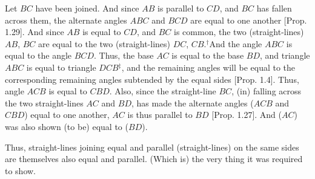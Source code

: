 \begin{Parallel}{}{}
{Let $BC$ have been joined. And since $AB$ is parallel to $CD$, and $BC$ has
fallen across them, the alternate angles $ABC$ and $BCD$ are equal to one another [Prop. 1.29]. And since $AB$ is equal to $CD$, and $BC$ is common,
the two (straight-lines) $AB$, $BC$ are equal to the two (straight-lines)
$DC$, $CB$.$^\dag$And the angle $ABC$ is equal to the angle $BCD$. Thus, the
base $AC$ is equal to the base $BD$, and triangle $ABC$ is equal to triangle
$DCB$$^\ddag$, and the remaining angles will be equal to the corresponding remaining
angles subtended by the equal sides [Prop. 1.4]. Thus,  angle $ACB$ 
is equal to $CBD$. Also, since the straight-line $BC$, (in) falling across the two
straight-lines $AC$ and $BD$, has made the alternate angles  ($ACB$ and $CBD$) equal to one another,
$AC$ is thus parallel to $BD$ [Prop. 1.27]. And ($AC$) was also shown (to be) equal
to ($BD$).

Thus, straight-lines joining equal and parallel (straight-lines) on the same sides
are  themselves also equal and parallel. (Which is) the very thing it was
required to show.}
\end{Parallel}


\vspace{7pt}{\footnotesize \noindent$^\dag$ The Greek text has ``$BC$, $CD$'', which is obviously a mistake.} \\


\vspace{7pt}{\footnotesize \noindent$^\ddag$ The Greek text has ``$DCB$'', which is obviously a mistake.} 


